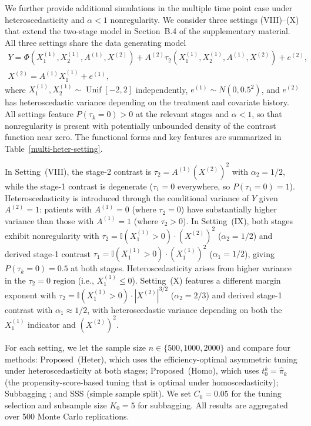 \documentclass[11pt]{article}
\theoremstyle{referenceplain}
\theoremstyle{referencedefinition}
\theoremstyle{referenceremark}
\begin{document}
We further provide additional simulations in the multiple time point case under heteroscedasticity and $\alpha < 1$ nonregularity. We consider three settings (VIII)--(X) that extend the two-stage model in Section~B.4 of the supplementary material. All three settings share the data generating model
\begin{align*}
    Y=\Phi\left(X_{1}^{(1)}, X_{2}^{(1)}, A^{(1)}, X^{(2)}\right)+A^{(2)} \tau_2\left(X_{1}^{(1)}, X_{2}^{(1)}, A^{(1)}, X^{(2)}\right)+e^{(2)}, \\
X^{(2)}=A^{(1)} X_{1}^{(1)}+e^{(1)},
\end{align*}
where $X_1^{(1)}, X_2^{(1)} \sim \operatorname{Unif}[-2,2]$ independently, $e^{(1)} \sim N(0, 0.5^2)$, and $e^{(2)}$ has heteroscedastic variance depending on the treatment and covariate history. All settings feature $P(\tau_k = 0) > 0$ at the relevant stages and $\alpha < 1$, so that nonregularity is present with potentially unbounded density of the contrast function near zero. The functional forms and key features are summarized in Table~\ref{multi-heter-setting}.

In Setting~(VIII), the stage-2 contrast is $\tau_2 = A^{(1)} (X^{(2)})^2$ with $\alpha_2 = 1/2$, while the stage-1 contrast is degenerate ($\tau_1 = 0$ everywhere, so $P(\tau_1 = 0) = 1$). Heteroscedasticity is introduced through the conditional variance of $Y$ given $A^{(2)} = 1$: patients with $A^{(1)} = 0$ (where $\tau_2 = 0$) have substantially higher variance than those with $A^{(1)} = 1$ (where $\tau_2 > 0$). In Setting~(IX), both stages exhibit nonregularity with $\tau_2 = \mathbb{I}(X_1^{(1)} > 0) \cdot (X^{(2)})^2$ ($\alpha_2 = 1/2$) and derived stage-1 contrast $\tau_1 = \mathbb{I}(X_1^{(1)} > 0) \cdot (X_1^{(1)})^2$ ($\alpha_1 = 1/2$), giving $P(\tau_k = 0) = 0.5$ at both stages. Heteroscedasticity arises from higher variance in the $\tau_2 = 0$ region (i.e., $X_1^{(1)} \leq 0$). Setting~(X) features a different margin exponent with $\tau_2 = \mathbb{I}(X_1^{(1)} > 0) \cdot |X^{(2)}|^{3/2}$ ($\alpha_2 = 2/3$) and derived stage-1 contrast with $\alpha_1 \approx 1/2$, with heteroscedastic variance depending on both the $X_1^{(1)}$ indicator and $(X^{(2)})^2$.

For each setting, we let the sample size $n \in \{500, 1000, 2000\}$ and compare four methods: Proposed~(Heter), which uses the efficiency-optimal asymmetric tuning under heteroscedasticity at both stages; Proposed~(Homo), which uses $t_0^k = \widehat{\pi}_k$ (the propensity-score-based tuning that is optimal under homoscedasticity); Subbagging \citep{shi2020breaking}; and SSS (simple sample split). We set ${C_0} = 0.05$ for the tuning selection and subsample size $K_0 = 5$ for subbagging. All results are aggregated over 500 Monte Carlo replications.
\end{document}
